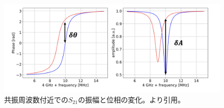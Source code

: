 \begin{figure}[htbp]
  \centering
  \includegraphics[width=1.0\columnwidth]{5_alignment/figs/amp_and_phase.png}
  \caption{共振周波数付近での$S_{21}$の振幅と位相の変化。\cite{sueno_doctor}より引用。}
  \label{amp_and_phase}
\end{figure}

